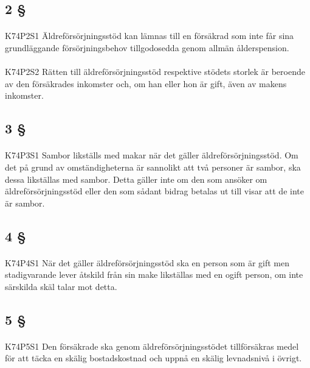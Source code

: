 \documentclass[a4paper,notitlepage,openany,10pt]{book}
\begin{document}
\subsection*{2 §}
\paragraph*{}
{\tiny K74P2S1}
Äldreförsörjningsstöd kan lämnas till en försäkrad som inte får sina grundläggande försörjningsbehov tillgodosedda genom allmän ålderspension.
\paragraph*{}
{\tiny K74P2S2}
Rätten till äldreförsörjningsstöd respektive stödets storlek är beroende av den försäkrades inkomster och, om han eller hon är gift, även av makens inkomster.
\subsection*{3 §}
\paragraph*{}
{\tiny K74P3S1}
Sambor likställs med makar när det gäller äldreförsörjningsstöd. Om det på grund av omständigheterna är sannolikt att två personer är sambor, ska dessa likställas med sambor. Detta gäller inte om den som ansöker om äldreförsörjningsstöd eller den som sådant bidrag betalas ut till visar att de inte är sambor.
\subsection*{4 §}
\paragraph*{}
{\tiny K74P4S1}
När det gäller äldreförsörjningsstöd ska en person som är gift men stadigvarande lever åtskild från sin make likställas med en ogift person, om inte särskilda skäl talar mot detta.
\subsection*{5 §}
\paragraph*{}
{\tiny K74P5S1}
Den försäkrade ska genom äldreförsörjningsstödet tillförsäkras medel för att täcka en skälig bostadskostnad och uppnå en skälig levnadsnivå i övrigt.
\end{document}
